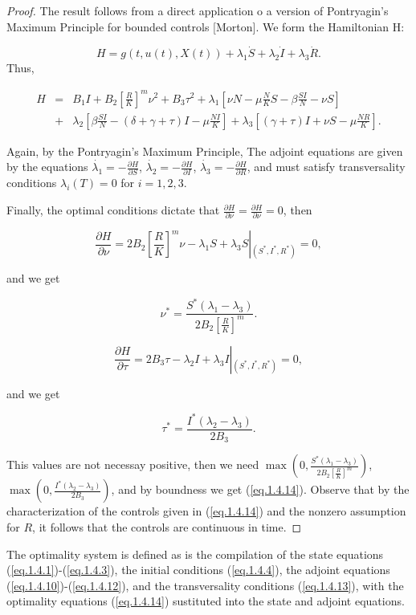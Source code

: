 \begin{proof}
The result follows from a direct application o a version of Pontryagin's Maximum Principle for bounded controls [Morton]. We form the Hamiltonian H:

$$H=g(t,u(t),X(t))+\lambda_1\dot{S}+\lambda_2\dot{I}+\lambda_3\dot{R}.$$
Thus,

\begin{eqnarray}\label{eq.1.4.15}
H&=&B_1I+B_2 [\frac{R}{K}]^m\nu^2+B_3\tau^2+\lambda_1[\nu N-\mu\frac{N}{K}S-\beta\frac{SI}{N}-\nu S]\nonumber\\
&+&\lambda_2[\beta \frac{SI}{N}-(\delta+\gamma+\tau)I-\mu\frac{NI}{K}]+\lambda_3[(\gamma+\tau)I+\nu S-\mu\frac{NR}{K}].
\end{eqnarray}

Again, by the Pontryagin's Maximum Principle, The adjoint equations are given by the equations $\dot{\lambda_1}=-\frac{\partial H}{\partial S}$, $\dot{\lambda_2}=-\frac{\partial H}{\partial I}$, $\dot{\lambda_3}=-\frac{\partial H}{\partial R}$, and must satisfy transversality conditions $\lambda_i(T)=0$ for $i=1,2,3$. 

Finally, the optimal conditions dictate that $\frac{\partial H}{\partial \nu}=\frac{\partial H}{\partial \nu}=0$, then

$$\frac{\partial H}{\partial \nu}=2B_2\left[\frac{R}{K}\right]^m\nu-\lambda_1 S+\lambda_3 S\left|_{(S^*,I^*,R^*)}\right.=0,$$

and we get 

$$\nu^*=\frac{S^*(\lambda_1-\lambda_3)}{2B_2\left[\frac{R}{K}\right]^m}.$$

$$\frac{\partial H}{\partial \tau}=2B_3\tau-\lambda_2 I+\lambda_3 I\left|_{(S^*,I^*,R^*)}\right.=0,$$

and we get 

$$\tau^*=\frac{I^*(\lambda_2 -\lambda_3)}{2B_3}.$$

This values are not necessay positive, then we need $\max\left (0,\frac{S^*(\lambda_1-\lambda_3)}{2B_2\left[\frac{R}{K}\right]^m}\right )$, $\max\left ( 0,\frac{I^*(\lambda_2 -\lambda_3)}{2B_3}\right )$, and by boundness we get (\ref{eq.1.4.14}). Observe that by the characterization of the controls given in (\ref{eq.1.4.14}) and the nonzero assumption for $R$, it follows that the controls are continuous in time.	
\end{proof}

The optimality system is defined as is the compilation of the state equations (\ref{eq.1.4.1})-(\ref{eq.1.4.3}), the initial conditions (\ref{eq.1.4.4}), the adjoint equations (\ref{eq.1.4.10})-(\ref{eq.1.4.12}), and the transversality conditions (\ref{eq.1.4.13}), with the optimality equations (\ref{eq.1.4.14}) sustituted into the state and adjoint equations.

